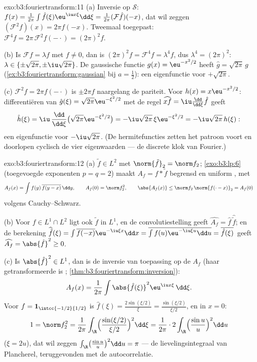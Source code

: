 \begin{solution}{exo:b3:fouriertransform:11}
(a) Inversie op $\mathcal S$: $f(x) = \frac1{2\pi}\int\hat
f(\xi)\eu^{\iu x\xi}\dd\xi = \frac1{2\pi}(\mathcal F\hat f)(-x)$,
dat wil zeggen $(\mathcal F^2f)(x) = 2\pi f(-x)$. Tweemaal
toegepast: $\mathcal F^4f = 2\pi\,\mathcal F^2f(-\cdot) =
(2\pi)^2f$.

(b) Is $\mathcal Ff = \lambda f$ met $f \neq 0$, dan is
$(2\pi)^2f = \mathcal F^4f = \lambda^4f$, dus $\lambda^4 =
(2\pi)^2$: $\lambda \in \{\pm\sqrt{2\pi}, \pm\iu\sqrt{2\pi}\}$.
De gaussische functie $g(x) = \eu^{-x^2/2}$ heeft $\hat g =
\sqrt{2\pi}\,g$ (\cref{ex:b3:fouriertransform:gaussian} bij $a =
\frac12$): een eigenfunctie voor $+\sqrt{2\pi}$.

(c) $\mathcal F^2f = 2\pi f(-\cdot)$ is $\pm2\pi f$ naargelang de
pariteit. Voor $h(x) = x\eu^{-x^2/2}$: differentiëren van $\hat
g(\xi) = \sqrt{2\pi}\eu^{-\xi^2/2}$ met de regel $\widehat{xf} =
\iu\frac{\dd}{\dd\xi}\hat f$ geeft
\[
\hat h(\xi) = \iu\,\frac{\dd}{\dd\xi}\bigl(\sqrt{2\pi}
\eu^{-\xi^2/2}\bigr) = -\iu\sqrt{2\pi}\,\xi\eu^{-\xi^2/2}
= -\iu\sqrt{2\pi}\,h(\xi) :
\]
een eigenfunctie voor $-\iu\sqrt{2\pi}$. (De hermitefuncties
zetten het patroon voort en doorlopen cyclisch de vier
eigenwaarden --- de discrete klok van Fourier.)

\end{solution}

\begin{solution}{exo:b3:fouriertransform:12}
(a) $\tilde f \in L^2$ met $\norm{\tilde f}_2 = \norm f_2$;
\cref{exo:b3:lp:6} (toegevoegde exponenten $p = q = 2$) maakt
$A_f = f * \tilde f$ begrensd en uniform , met
\[
A_f(x) = \int f(y)\,\overline{f(y - x)}\,\dd y,
\qquad A_f(0) = \norm f_2^2,
\qquad \abs{A_f(x)} \leq \norm f_2\,\norm{f(\cdot -
x)}_2 = A_f(0)
\]
volgens Cauchy--Schwarz.

(b) Voor $f \in L^1\cap L^2$ ligt ook $\tilde f$ in $L^1$, en de
convolutiestelling geeft $\widehat{A_f} = \hat f\,
\widehat{\tilde f}$; en de berekening $\widehat{\tilde f}(\xi) =
\int\overline{f(-x)}\eu^{-\iu\xi x}\dd x = \overline{\int
f(u)\eu^{-\iu\xi u}\dd u} = \overline{\hat f(\xi)}$ geeft
$\widehat{A_f} = \abs{\hat f}^2 \geq 0$.

(c) Is $\abs{\hat f}^2 \in L^1$, dan is de inversie van
toepassing op de  $A_f$ (haar getransformeerde is
; \cref{thm:b3:fouriertransform:inversion}):
\[
A_f(x) = \frac1{2\pi}\int\abs{\hat f(\xi)}^2
\eu^{\iu x\xi}\,\dd\xi .
\]
Voor $f = \mathbf 1_{\intcc{-1/2}{1/2}}$ is $\hat f(\xi) =
\frac{2\sin(\xi/2)}\xi = \frac{\sin(\xi/2)}{\xi/2}$, en in $x =
0$:
\[
1 = \norm f_2^2 = \frac1{2\pi}\int_\R
\Bigl(\frac{\sin(\xi/2)}{\xi/2}\Bigr)^2\dd\xi
= \frac1{2\pi}\cdot2\int_\R\Bigl(\frac{\sin u}u\Bigr)^2\dd u
\]
($\xi = 2u$), dat wil zeggen $\int_\R\bigl(\frac{\sin
u}u\bigr)^2\dd u = \pi$ --- de lievelingsintegraal van
Plancherel, teruggevonden met de autocorrelatie.
\end{solution}

